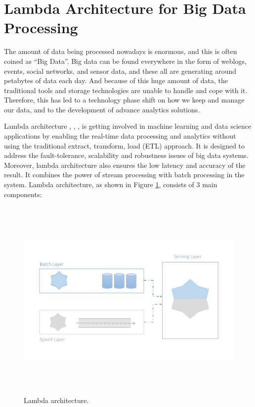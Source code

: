 \section{Lambda Architecture for Big Data Processing} \label{sec:lmb_arc}
The amount of data being processed nowadays is enormous, and this is often coined as ``Big Data''. Big data can be found everywhere in the form of weblogs, events, social networks, and sensor data, and these all are generating around petabytes of data each day. And because of this huge amount of data, the traditional tools and storage technologies are unable to handle and cope with it. Therefore, this has led to a technology phase shift on how we keep and manage our data, and to the development of advance analytics solutions.

Lambda architecture \cite{UBDLAH}, \cite{oreillyla}, \cite{7364082}, \cite{maprla} is getting involved in machine learning and data science applications by enabling the real-time data processing and analytics without using the traditional extract, transform, load (ETL) approach. It is designed to address the fault-tolerance, scalability and robustness issues of big data systems. Moreover, lambda architecture also ensures the low latency and accuracy of the result. It combines the power of stream processing with batch processing in the system.
Lambda architecture, as shown in Figure \ref{fig:lambda_arc}, consists of 3 main components:

\begin{figure}[htpb]
	\centering
	\includegraphics[width=12cm,height=10cm,keepaspectratio=true]{images/lambda_arc}
	\caption{
		Lambda architecture.
	}
	\label{fig:lambda_arc}
\end{figure}



